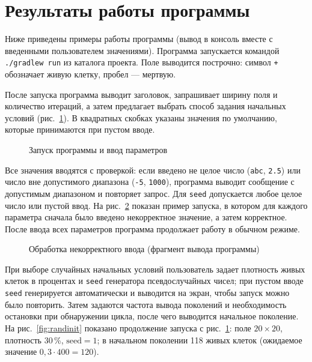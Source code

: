 \documentclass[a4paper,14pt]{extarticle}
\newcommand{\consolemedium}{\fontsize{9}{10.5}\selectfont\ttfamily}
\newcommand{\consolesmall}{\fontsize{7}{7.35}\selectfont\ttfamily}
\newcommand{\console}[2][\consolesmall]{}
\begin{document}
\section{Результаты работы программы}
\label{sec:results}

Ниже приведены примеры работы программы (вывод в консоль вместе с введенными пользователем значениями). Программа запускается командой \texttt{./gradlew run} из каталога проекта. Поле выводится построчно: символ \texttt{+} обозначает живую клетку, пробел --- мертвую.

После запуска программа выводит заголовок, запрашивает ширину поля и количество итераций, а затем предлагает выбрать способ задания начальных условий (рис.~\ref{fig:start}). В квадратных скобках указаны значения по умолчанию, которые принимаются при пустом вводе.

\begin{figure}[H]
	\centering
	\console[\consolemedium]{start}
	\caption{Запуск программы и ввод параметров}
	\label{fig:start}
\end{figure}

Все значения вводятся с проверкой: если введено не целое число (\texttt{abc}, \texttt{2.5}) или число вне допустимого диапазона (\texttt{-5}, \texttt{1000}), программа выводит сообщение с допустимым диапазоном и повторяет запрос. Для \texttt{seed} допускается любое целое число или пустой ввод. На рис.~\ref{fig:error} показан пример запуска, в котором для каждого параметра сначала было введено некорректное значение, а затем корректное. После ввода всех параметров программа продолжает работу в обычном режиме.

\begin{figure}[H]
	\centering
	\console[\consolemedium]{error}
	\caption{Обработка некорректного ввода (фрагмент вывода программы)}
	\label{fig:error}
\end{figure}

При выборе случайных начальных условий пользователь задает плотность живых клеток в процентах и \texttt{seed} генератора псевдослучайных чисел; при пустом вводе \texttt{seed} генерируется автоматически и выводится на экран, чтобы запуск можно было повторить. Затем задаются частота вывода поколений и необходимость остановки при обнаружении цикла, после чего выводится начальное поколение. На рис.~\ref{fig:randinit} показано продолжение запуска с рис.~\ref{fig:start}: поле $20 \times 20$, плотность 30\,\%, $\text{seed} = 1$; в начальном поколении 118 живых клеток (ожидаемое значение $0{,}3 \cdot 400 = 120$).
\end{document}
